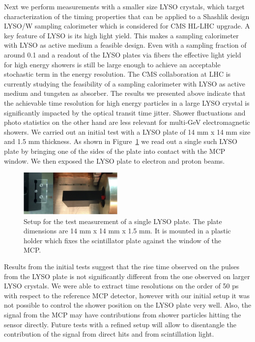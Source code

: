 \documentclass[11pt]{article}
\begin{document}
Next we perform measurements with a smaller size LYSO crystals, which target
characterization of the timing properties that can be applied to a Shashlik
design LYSO/W sampling calorimeter which is considered for CMS HL-LHC upgrade. A
key feature of LYSO is its high light yield. This makes a sampling calorimeter
with LYSO as active medium a feasible design. Even with a sampling fraction of
around 0.1 and a readout of the LYSO plates via fibers the effective light yield
for high energy showers is still be large enough to achieve an acceptable
stochastic term in the energy resolution. The CMS collaboration at LHC is
currently studying the feasibility of a sampling calorimeter with LYSO as active
medium and tungsten as absorber. The results we presented above indicate that
the achievable time resolution for high energy particles in a large LYSO crystal
is significantly impacted by the optical transit time jitter. Shower
fluctuations and photo statistics on the other hand are less relevant for
multi-GeV electromagnetic showers. We carried out an initial
test with a LYSO plate of 14 mm x 14 mm size and 1.5 mm thickness.  As shown in Figure~\ref{fig:ShashlikTile} we
read out a single such LYSO plate by bringing one of the sides of the plate into
contact with the MCP window. We then exposed the LYSO plate to electron and
proton beams.

\begin{figure}[h] \centering
\includegraphics[width=0.45\textwidth]{figs/ShashlikTile} 
\caption{Setup for the test measurement of a single LYSO plate. The plate dimensions are 14 mm x 14 mm x 1.5 mm. It is mounted in a plastic holder which fixes the scintillator plate against the window of the MCP.} 
\label{fig:ShashlikTile}
\end{figure}

Results from the initial tests suggest that the rise time observed on the pulses
from the LYSO plate is not significantly different from the one observed on
larger LYSO crystals. We were able to extract time resolutions on the order of
50 ps with respect to the reference MCP detector, however with our initial setup it was
not possible to control the shower position on the LYSO plate very well. Also,
the signal from the MCP may have contributions from shower particles hitting the
sensor directly. Future tests with a refined setup will allow to disentangle the
contribution of the signal from direct hits and from scintillation light. 
\end{document}
